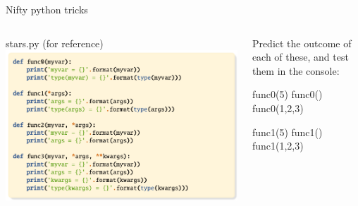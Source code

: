 \documentclass[aspectratio=149] {beamer}
\begin{document}
\begin{frame}[fragile,t]{ Nifty python tricks}

  \begin{columns}
    \begin{column}[t]{.48\textwidth}
      stars.py (for reference)
      \includegraphics[scale=.85, trim= 0 0 7cm 0, clip]{stars.pdf}
    \end{column}
   
    \begin{column}[t]{.48\textwidth}
      Predict the outcome of each of these, 
      and test them in the console:
      \begin{pythoncode}
        func0(5)
        func0()
        func0(1,2,3)	
      \end{pythoncode}
  
      \pause
      \begin{pythoncode}
        func1(5)
        func1()
        func1(1,2,3)	
      \end{pythoncode}
    \end{column}
  \end{columns}

\end{frame}
\end{document}
